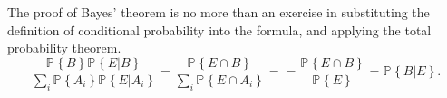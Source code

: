 \documentclass[12pt]{article}
\newcommand{\Prob}[2]{\mathbb{P}_{#1}\left\{#2\right\}}
\begin{document}
\newcommand{\prob}[1]{\Prob{}{#1}}
The proof of Bayes' theorem is no more than an exercise in substituting the definition of conditional probability into the formula, and applying the total probability theorem.
$$
\frac{\prob{B}\prob{E|B}}{\sum_i \prob{A_i}\prob{E|A_i}} =
\frac{\prob{E\cap B}}{\sum_i \prob{E\cap A_i}} =
= \frac{\prob{E\cap B}}{\prob{E}} = \prob{B|E}.
$$
\end{document}
